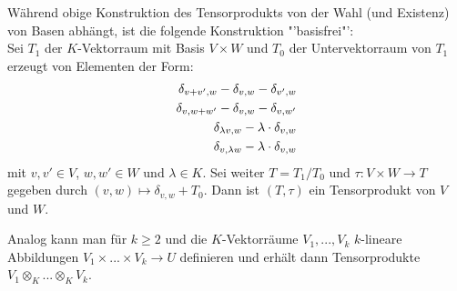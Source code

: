 \begin{remark}
	Während obige Konstruktion des Tensorprodukts von der Wahl (und Existenz) von Basen abhängt, ist die folgende Konstruktion "'basisfrei"': \\
	Sei $T_1$ der $K$-Vektorraum mit Basis $V\times W$ und $T_0$ der Untervektorraum von $T_1$ erzeugt von Elementen der Form:
	\begin{align}
		\delta_{v+v',w}-\delta_{v,w}-\delta_{v',w} \notag \\
		\delta_{v,w+w'}-\delta_{v,w}-\delta_{v,w'} \notag \\
		\delta_{\lambda v,w}-\lambda\cdot \delta_{v,w} \notag \\
		\delta_{v,\lambda w}-\lambda\cdot\delta_{v,w}\notag
	\end{align}
	mit $v,v'\in V$, $w,w'\in W$ und $\lambda\in K$. Sei weiter $T=T_1/T_0$ und $\tau:V\times W\to T$ gegeben durch $(v,w)\mapsto\delta_{v,w}+T_0$. Dann ist $(T,\tau)$ ein Tensorprodukt von $V$ und $W$.
	\begin{center}
	\end{center}
\end{remark}

\begin{remark}
	Analog kann man für $k\ge 2$ und die $K$-Vektorräume $V_1,...,V_k$ $k$-lineare Abbildungen $V_1\times ...\times V_k\to U$ definieren und erhält dann Tensorprodukte $V_1\otimes_K ... \otimes_K V_k$.
\end{remark}